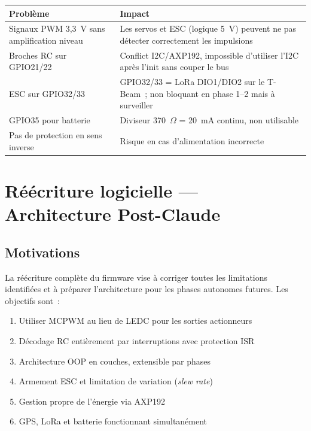 \documentclass[12pt,a4paper]{article}
\begin{document}
\begin{longtable}{L{3.5cm} L{9.5cm}}
  \toprule
  \textcolor{tableheadfg}{\textbf{Problème}} &
  \textcolor{tableheadfg}{\textbf{Impact}} \\
  \midrule
  \endhead
  \bottomrule
  \endfoot
  Signaux PWM 3,3~V sans amplification niveau & Les servos et ESC
    (logique 5~V) peuvent ne pas détecter correctement les impulsions \\[3pt]
  Broches RC sur GPIO21/22 & Conflict I2C/AXP192, impossible d'utiliser
    l'I2C après l'init sans couper le bus \\[3pt]
  ESC sur GPIO32/33 & GPIO32/33 = LoRa DIO1/DIO2 sur le T-Beam~;
    non bloquant en phase 1--2 mais à surveiller \\[3pt]
  GPIO35 pour batterie & Diviseur 370~$\Omega$ = 20~mA continu, non utilisable \\[3pt]
  Pas de protection en sens inverse & Risque en cas d'alimentation incorrecte \\
\end{longtable}

\section{Réécriture logicielle — Architecture Post-Claude}

\subsection{Motivations}

La réécriture complète du firmware vise à corriger toutes les limitations
identifiées et à préparer l'architecture pour les phases autonomes futures.
Les objectifs sont~:

\begin{enumerate}
  \item Utiliser MCPWM au lieu de LEDC pour les sorties actionneurs
  \item Décodage RC entièrement par interruptions avec protection ISR
  \item Architecture OOP en couches, extensible par phases
  \item Armement ESC et limitation de variation (\emph{slew rate})
  \item Gestion propre de l'énergie via AXP192
  \item GPS, LoRa et batterie fonctionnant simultanément
\end{enumerate}
\end{document}
